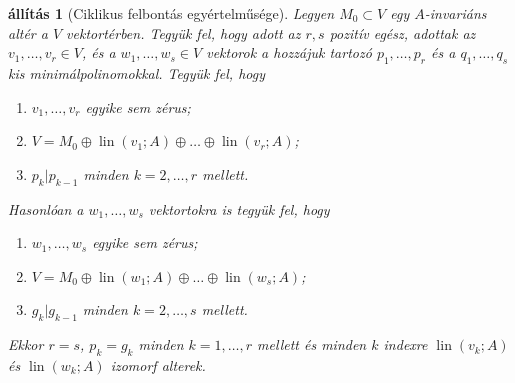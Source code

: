 \documentclass[a4paper, showtrims]{memoir}
\theoremstyle{plain}
\newtheorem{proposition}{állítás}[chapter]
\theoremstyle{remark}
\theoremstyle{definition}
\DeclareMathOperator{\lin}{lin}
\begin{document}
\begin{proposition}[Ciklikus felbontás egyértelműsége]
    Legyen $M_0\subset V$ egy $A$-invariáns altér a $V$ vektortérben.
    Tegyük fel, hogy adott az $r,s$ pozitív egész, adottak az 
    $v_1,\dots,v_r\in V$, és a $w_1,\dots,w_s\in V$ vektorok
    a hozzájuk tartozó $p_1,\dots,p_r$ és a $q_1,\dots,q_s$ kis minimálpolinomokkal.
    Tegyük fel, hogy 
    \begin{enumerate}
        \item $v_1,\dots,v_r$ egyike sem zérus;
        \item $V=M_0\oplus\lin\left( v_1;A \right)\oplus\ldots\oplus\lin\left( v_r;A \right)$;
        \item $p_{k}|p_{k-1}$ minden $k=2,\ldots,r$ mellett.
    \end{enumerate}
    Hasonlóan a $w_1,\dots,w_s$ vektortokra is tegyük fel, hogy 
    \begin{enumerate}
        \item $w_1,\dots,w_s$ egyike sem zérus;
        \item $V=M_0\oplus\lin\left( w_1;A \right)\oplus\ldots\oplus\lin\left( w_s;A \right)$;
        \item $g_{k}|g_{k-1}$ minden $k=2,\ldots,s$ mellett.
    \end{enumerate}
    Ekkor $r=s$, $p_k=g_k$ minden $k=1,\ldots,r$ mellett és minden $k$ indexre
    $\lin\left( v_k;A \right)$ és $\lin\left( w_k;A \right)$ izomorf alterek.
\end{proposition}
\end{document}
